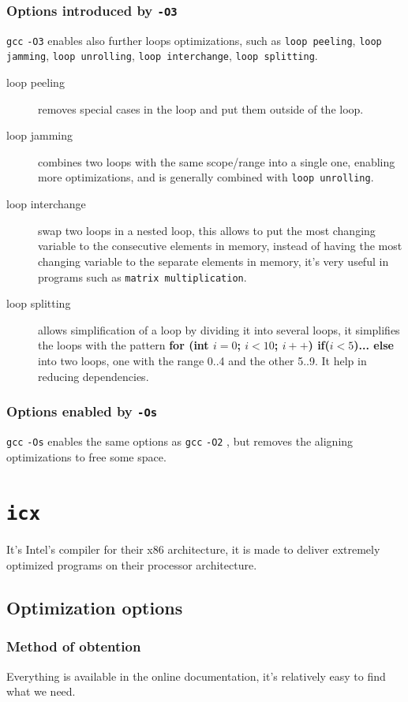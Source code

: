 \documentclass{rapport}
\newcommand{\gcc}{\texttt{gcc} }
\newcommand{\icx}{\texttt{icx} }
\newcommand{\optitwo}{\texttt{-O2} }
\newcommand{\optithree}{\texttt{-O3} }
\newcommand{\optisize}{\texttt{-Os} }
\begin{document}
\subsubsection{Options introduced by \optithree}
\gcc \optithree enables also further loops optimizations, such as \texttt{loop peeling}, \texttt{loop jamming}, \texttt{loop unrolling}, \texttt{loop interchange}, \texttt{loop splitting}.
\begin{description}
\item[loop peeling] removes special cases in the loop and put them outside of the loop.
\item[loop jamming] combines two loops with the same scope/range into a single one, enabling more optimizations, and is generally combined with \texttt{loop unrolling}.
\item[loop interchange] swap two loops in a nested loop, this allows to put the most changing variable to the consecutive elements in memory, instead of 
having the most changing variable to the separate elements in memory, it's very useful in programs such as \texttt{matrix multiplication}.
\item[loop splitting] allows simplification of a loop by dividing it into several loops, it simplifies the loops with the pattern \textbf{for (int $i=0$; $i<10$; $i++$) 
if($i<5$)... else} into two loops, one with the range 0..4 and the other 5..9. It help in reducing dependencies.
\end{description}


\subsubsection{Options enabled by \optisize}
\gcc \optisize enables the same options as \gcc \optitwo, but removes the aligning optimizations to free some space.






\section{\icx}
It's Intel's compiler for their x86 architecture, it is made to deliver extremely optimized programs on their processor architecture.
\subsection{Optimization options}
\subsubsection{Method of obtention}
Everything is available in the online documentation, it's relatively easy to find what we need.
\end{document}
